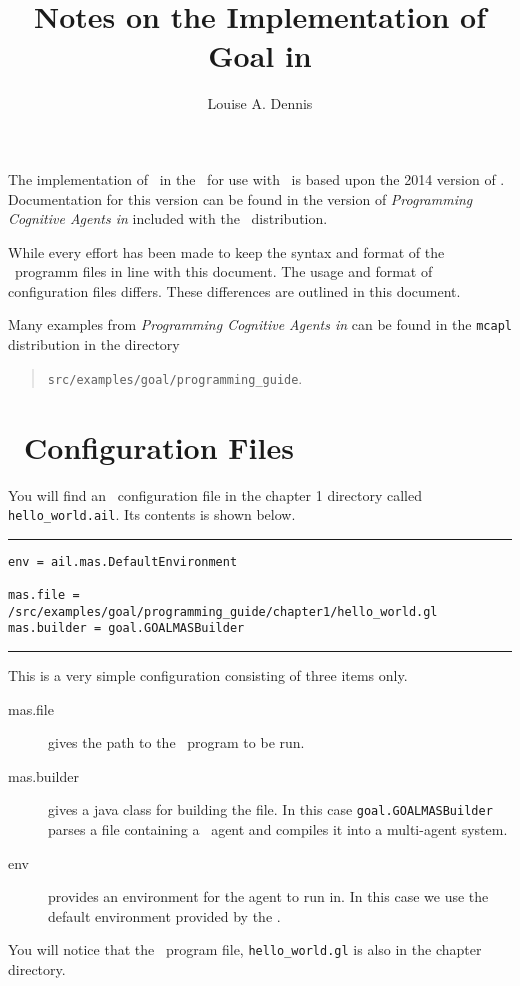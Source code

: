 \documentclass[a4]{article}
\title{Notes on the Implementation of {\sc Goal} in \ajpf}
\author{Louise A. Dennis}
\begin{document}
\maketitle

The implementation of \goal\ in the \ail\ for use with \ajpf\ is based upon the 2014 version of \goal.  Documentation for this version can be found in the version of \emph{Programming Cognitive Agents in \goal} included with the \ajpf\ distribution.

While every effort has been made to keep the syntax and format of the \goal\ programm files in line with this document.  The usage and format of configuration files differs.  These differences are outlined in this document.

Many examples from \emph{Programming Cognitive Agents in \goal} can be found in the \texttt{mcapl} distribution in the directory
\begin{quote}
  \texttt{src/examples/goal/programming\_guide}.
\end{quote}

\section{\ail\ Configuration Files}
\label{sec:config}

You will find an \ail\ configuration file in the chapter 1 directory called \texttt{hello\_world.ail}.  Its contents is shown below.

\newpage\noindent\rule{\textwidth}{1pt}
\begin{verbatim}
env = ail.mas.DefaultEnvironment

mas.file = /src/examples/goal/programming_guide/chapter1/hello_world.gl
mas.builder = goal.GOALMASBuilder
\end{verbatim}
\rule{\textwidth}{1pt}

This is a very simple configuration consisting of three items only.
\begin{description}
\item[mas.file] gives the path to the \goal\ program to be run.
\item[mas.builder] gives a java class for building the file.  In this case \texttt{goal.GOALMASBuilder} parses a file containing a \goal\ agent and compiles it into a multi-agent system.
\item[env] provides an environment for the agent to run in.  In this case we use the default environment provided by the \ail.
\end{description}
You will notice that the \goal\ program file, \texttt{hello\_world.gl} is also in the chapter directory.
\end{document}
